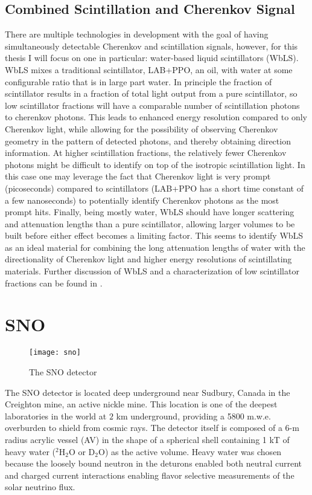 \subsection{Combined Scintillation and Cherenkov Signal}

There are multiple technologies in development with the goal of having simultaneously detectable Cherenkov and scintillation signals, however, for this thesis I will focus on one in particular: water-based liquid scintillators (WbLS).
WbLS mixes a traditional scintillator, LAB+PPO, an oil, with water at some configurable ratio that is in large part water.
In principle the fraction of scintillator results in a fraction of total light output from a pure scintillator, so low scintillator fractions will have a comparable number of scintillation photons to cherenkov photons. 
This leads to enhanced energy resolution compared to only Cherenkov light, while allowing for the possibility of observing Cherenkov geometry in the pattern of detected photons, and thereby obtaining direction information.
At higher scintillation fractions, the relatively fewer Cherenkov photons might be difficult to identify on top of the isotropic scintillation light.
In this case one may leverage the fact that Cherenkov light is very prompt (picoseconds) compared to scintillators (LAB+PPO has a short time constant of a few nanoseconds) to potentially identify Cherenkov photons as the most prompt hits.
Finally, being mostly water, WbLS should have longer scattering and attenuation lengths than a pure scintillator, allowing larger volumes to be built before either effect becomes a limiting factor.
This seems to identify WbLS as an ideal material for combining the long attenuation lengths of water with the directionality of Cherenkov light and higher energy resolutions of scintillating materials.
Further discussion of WbLS and a characterization of low scintillator fractions can be found in .

\section{SNO}

\begin{figure}
\centering
    \texttt{[image: sno]}
    \caption{\label{fig:sno}The SNO detector \cite{3phase}}
\end{figure}

The SNO \cite{sno} detector is located deep underground near Sudbury, Canada in the Creighton mine, an active nickle mine.
This location is one of the deepest laboratories in the world at $2$ km underground, providing a 5800 m.w.e. overburden to shield from cosmic rays.
The detector itself is composed of a 6-m radius acrylic vessel (AV) in the shape of a spherical shell containing 1 kT of heavy water ($^2$H$_2$O or D$_2$O) as the active volume.
Heavy water was chosen because the loosely bound neutron in the deturons enabled both neutral current and charged current interactions enabling flavor selective measurements of the solar neutrino flux.

